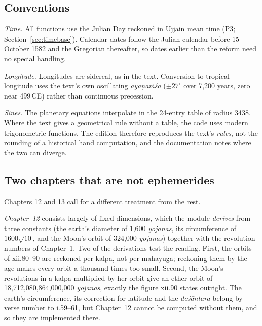 \documentclass[11pt,a4paper]{article}
\begin{document}
\subsection{Conventions}
\label{sec:conventions}

\emph{Time.} All functions use the Julian Day reckoned in Ujjain mean time (P3; Section~\ref{sec:timebase}). Calendar dates follow the Julian calendar before 15 October 1582 and the Gregorian thereafter, so dates earlier than the reform need no special handling.

\emph{Longitude.} Longitudes are sidereal, as in the text. Conversion to tropical longitude uses the text's own oscillating \textit{aya\d{n}\=a\.m\'sa} ($\pm 27^\circ$ over 7,200 years, zero near 499\,CE) rather than continuous precession.

\emph{Sines.} The planetary equations interpolate in the 24-entry table of radius 3438. Where the text gives a geometrical rule without a table, the code uses modern trigonometric functions. The edition therefore reproduces the text's \emph{rules}, not the rounding of a historical hand computation, and the documentation notes where the two can diverge.

\subsection{Two chapters that are not ephemerides}

Chapters 12 and 13 call for a different treatment from the rest.

\emph{Chapter~12} consists largely of fixed dimensions, which the module \emph{derives} from three constants (the earth's diameter of 1,600 \textit{yojanas}, its circumference of $1600\sqrt{10}$, and the Moon's orbit of 324,000 \textit{yojanas}) together with the revolution numbers of Chapter~1. Two of the derivations test the reading. First, the orbits of xii.80--90 are reckoned per kalpa, not per mahayuga; reckoning them by the age makes every orbit a thousand times too small. Second, the Moon's revolutions in a kalpa multiplied by her orbit give an ether orbit of 18,712,080,864,000,000 \textit{yojanas}, exactly the figure xii.90 states outright. The earth's circumference, its correction for latitude and the \textit{de\'s\=antara} belong by verse number to i.59--61, but Chapter~12 cannot be computed without them, and so they are implemented there.
\end{document}
